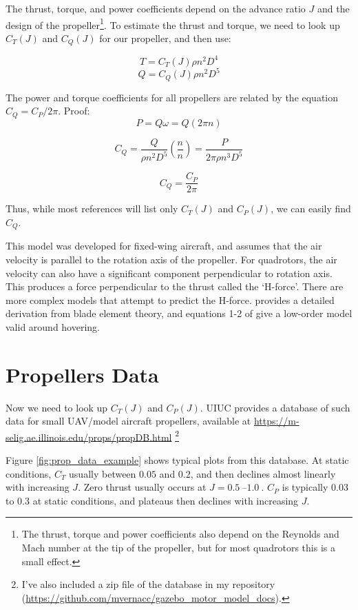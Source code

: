 \documentclass[12pt]{article}
\begin{document}
The thrust, torque, and power coefficients depend on the advance ratio $J$ and the design of the propeller\footnote{The thrust, torque and power coefficients also depend on the Reynolds and Mach number at the tip of the propeller, but for most quadrotors this is a small effect.}. To estimate the thrust and torque, we need to look up $C_T(J)$ and $C_Q(J)$ for our propeller, and then use:

\begin{equation}
    T = C_T(J) \rho n^2 D^4
\end{equation}
\begin{equation}
    Q = C_Q(J) \rho n^2 D^5
\end{equation}


The power and torque coefficients for all propellers are related by the equation $C_Q = C_P / 2 \pi$. Proof:
\[
P = Q \omega = Q (2 \pi n)
\]

\[
C_Q = \frac{Q}{\rho n^2 D^5} \left( \frac{n}{n} \right) = \frac{P}{2 \pi \rho n^3 D^5}
\]

\begin{equation}
C_Q =  \frac{C_P}{2 \pi}
\end{equation}

Thus, while most references will list only $C_T(J)$ and $C_P(J)$, we can easily find $C_Q$.

This model was developed for fixed-wing aircraft, and assumes that the air velocity is parallel to the rotation axis of the propeller. For quadrotors, the air velocity can also have a significant component perpendicular to rotation axis. This produces a force perpendicular to the thrust called the `H-force'. There are more complex models that attempt to predict the H-force. \cite{2016arXiv160100733B} provides a detailed derivation from blade element theory, and equations 1-2 of \cite{martin:hal-00422423} give a low-order model valid around hovering.


\section{Propellers Data}

Now we need to look up $C_T(J)$ and $C_P(J)$. UIUC provides a database of such data for small UAV/model aircraft propellers, available at \url{https://m-selig.ae.illinois.edu/props/propDB.html} \footnote{I've also included a zip file of the database in my repository (\url{https://github.com/mvernacc/gazebo_motor_model_docs}).}

Figure \ref{fig:prop_data_example} shows typical plots from this database. At static conditions, $C_T$ usually between $0.05$ and $0.2$, and then declines almost linearly with increasing $J$. Zero thrust usually occurs at $J = \SIrange{0.5}{1.0}{}$. $C_P$ is typically $0.03$ to $0.3$ at static conditions, and plateaus then declines with increasing $J$.
\end{document}
